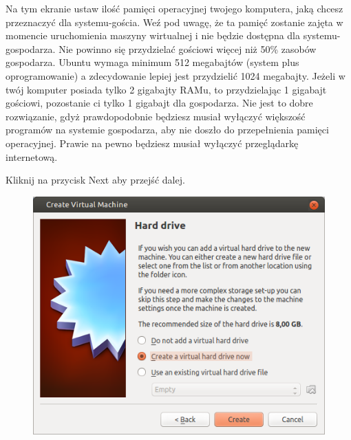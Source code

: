 Na tym ekranie ustaw ilość pamięci operacyjnej twojego komputera, jaką chcesz przeznaczyć dla systemu-gościa. Weź pod uwagę, że ta pamięć zostanie zajęta w momencie uruchomienia maszyny wirtualnej i nie będzie dostępna dla systemu-gospodarza. Nie powinno się przydzielać gościowi więcej niż 50\% zasobów gospodarza. Ubuntu wymaga minimum 512 megabajtów (system plus oprogramowanie) a zdecydowanie lepiej jest przydzielić 1024 megabajty.
Jeżeli w twój komputer posiada tylko 2 gigabajty RAMu, to przydzielając 1 gigabajt gościowi, pozostanie ci tylko 1 gigabajt dla gospodarza. Nie jest to dobre rozwiązanie, gdyż prawdopodobnie będziesz musiał wyłączyć większość programów na systemie gospodarza, aby nie doszło do przepełnienia pamięci operacyjnej. Prawie na pewno będziesz musiał wyłączyć przeglądarkę internetową.
\begin{flushright}
Kliknij na przycisk \textcolor{ubuntu_orange}{Next} aby przejść dalej.
\end{flushright}
\clearpage
\begin{figure}
                \includegraphics[width=\linewidth]{images/virtualbox_wizard3.png}
\end{figure}

